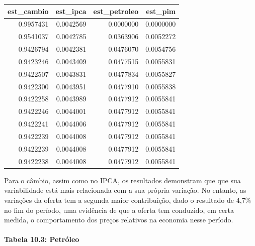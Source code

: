 \documentclass[12pt]{article}
\begin{document}
\begin{longtable}[]{@{}rrrr@{}}
\toprule
est\_cambio & est\_ipca & est\_petroleo & est\_pim \\
\midrule
\endhead
0.9957431 & 0.0042569 & 0.0000000 & 0.0000000 \\
0.9541037 & 0.0042785 & 0.0363906 & 0.0052272 \\
0.9426794 & 0.0042381 & 0.0476070 & 0.0054756 \\
0.9423246 & 0.0043409 & 0.0477515 & 0.0055831 \\
0.9422507 & 0.0043831 & 0.0477834 & 0.0055827 \\
0.9422300 & 0.0043951 & 0.0477910 & 0.0055838 \\
0.9422258 & 0.0043989 & 0.0477912 & 0.0055841 \\
0.9422246 & 0.0044001 & 0.0477912 & 0.0055841 \\
0.9422241 & 0.0044006 & 0.0477912 & 0.0055841 \\
0.9422239 & 0.0044008 & 0.0477912 & 0.0055841 \\
0.9422239 & 0.0044008 & 0.0477912 & 0.0055841 \\
0.9422238 & 0.0044008 & 0.0477912 & 0.0055841 \\
\bottomrule
\end{longtable}

Para o câmbio, assim como no IPCA, os resultados demonstram que que sua
variabilidade está mais relacionada com a sua própria variação. No
entanto, as variações da oferta tem a segunda maior contribuição, dado o
resultado de 4,7\% no fim do período, uma evidência de que a oferta tem
conduzido, em certa medida, o comportamento dos preços relativos na
economia nesse período.

\hypertarget{tabela-10.3-petruxf3leo}{%
\paragraph{Tabela 10.3: Petróleo}\label{tabela-10.3-petruxf3leo}}
\end{document}
